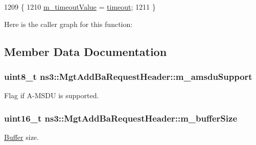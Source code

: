 \begin{DoxyCode}
1209 \{
1210   \hyperlink{classns3_1_1MgtAddBaRequestHeader_adb30ab7abdf354bc3555f49caf9f018c}{m\_timeoutValue} = \hyperlink{openflow-switch_8cc_a386d174ae121d1cfa279074b7e209714}{timeout};
1211 \}
\end{DoxyCode}


Here is the caller graph for this function\+:




\subsection{Member Data Documentation}
\subsubsection[{\texorpdfstring{m\+\_\+amsdu\+Support}{m_amsduSupport}}]{\setlength{\rightskip}{0pt plus 5cm}uint8\+\_\+t ns3\+::\+Mgt\+Add\+Ba\+Request\+Header\+::m\+\_\+amsdu\+Support\hspace{0.3cm}{\ttfamily [private]}}\hypertarget{classns3_1_1MgtAddBaRequestHeader_a46d3fea0161258da244407af56ba8a18}{}\label{classns3_1_1MgtAddBaRequestHeader_a46d3fea0161258da244407af56ba8a18}


Flag if A-\/\+M\+S\+DU is supported. 

\subsubsection[{\texorpdfstring{m\+\_\+buffer\+Size}{m_bufferSize}}]{\setlength{\rightskip}{0pt plus 5cm}uint16\+\_\+t ns3\+::\+Mgt\+Add\+Ba\+Request\+Header\+::m\+\_\+buffer\+Size\hspace{0.3cm}{\ttfamily [private]}}\hypertarget{classns3_1_1MgtAddBaRequestHeader_a8aee0e0d054334657dd127da85982f8c}{}\label{classns3_1_1MgtAddBaRequestHeader_a8aee0e0d054334657dd127da85982f8c}


\hyperlink{classns3_1_1Buffer}{Buffer} size. 


